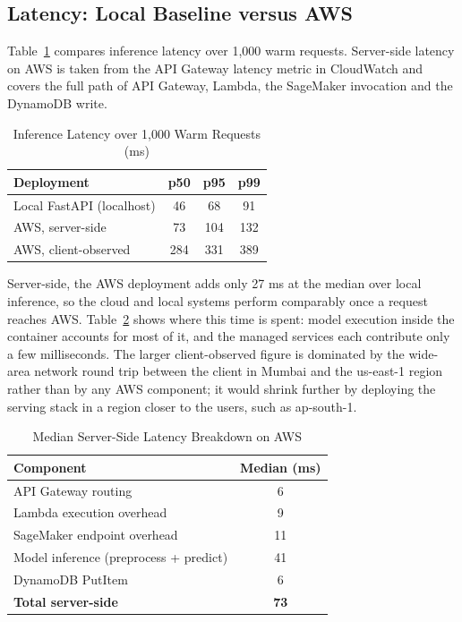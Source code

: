 \documentclass[conference]{IEEEtran}
\begin{document}
\subsection{Latency: Local Baseline versus AWS}
Table~\ref{tab:latency} compares inference latency over 1,000 warm requests. Server-side latency on AWS is taken from the API Gateway latency metric in CloudWatch and covers the full path of API Gateway, Lambda, the SageMaker invocation and the DynamoDB write.

\begin{table}[htbp]
\caption{Inference Latency over 1,000 Warm Requests (ms)}
\begin{center}
\begin{tabular}{|l|c|c|c|}
\hline
\textbf{Deployment} & \textbf{p50} & \textbf{p95} & \textbf{p99} \\
\hline
Local FastAPI (localhost) & 46 & 68 & 91 \\
AWS, server-side & 73 & 104 & 132 \\
AWS, client-observed & 284 & 331 & 389 \\
\hline
\end{tabular}
\label{tab:latency}
\end{center}
\end{table}

Server-side, the AWS deployment adds only 27 ms at the median over local inference, so the cloud and local systems perform comparably once a request reaches AWS. Table~\ref{tab:breakdown} shows where this time is spent: model execution inside the container accounts for most of it, and the managed services each contribute only a few milliseconds. The larger client-observed figure is dominated by the wide-area network round trip between the client in Mumbai and the us-east-1 region rather than by any AWS component; it would shrink further by deploying the serving stack in a region closer to the users, such as ap-south-1.

\begin{table}[htbp]
\caption{Median Server-Side Latency Breakdown on AWS}
\begin{center}
\begin{tabular}{|l|c|}
\hline
\textbf{Component} & \textbf{Median (ms)} \\
\hline
API Gateway routing & 6 \\
Lambda execution overhead & 9 \\
SageMaker endpoint overhead & 11 \\
Model inference (preprocess + predict) & 41 \\
DynamoDB PutItem & 6 \\
\hline
\textbf{Total server-side} & \textbf{73} \\
\hline
\end{tabular}
\label{tab:breakdown}
\end{center}
\end{table}
\end{document}
